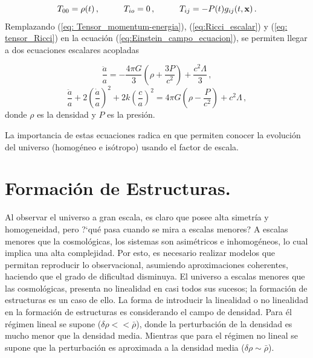\begin{equation}
T_{00}= \rho(t)\,, \hspace{1cm} T_{io}=0\,, \hspace{1cm} T_{ij}=-P(t)g_{ij}(t,\bf{x})\,.
\label{eq: Tensor_momentum-energia}
\end{equation}
%
Remplazando (\ref{eq: Tensor_momentum-energia}), (\ref{eq:Ricci_escalar}) y (\ref{eq: tensor_Ricci}) en la ecuación (\ref{eq:Einstein_campo_ecuacion}), se permiten llegar a dos ecuaciones escalares acopladas

\begin{equation}
\frac{\ddot{a}}{a} = -\frac{4\pi G}{3}\left(\rho + \frac{3P}{c^{2}} \right) + \frac{c^{2}\Lambda}{3}\,,
\end{equation}
\begin{equation}
\frac{\ddot{a}}{a}+2 \left(\frac{\dot{a}}{a}\right)^{2} + 2k\left(\frac{c}{a} \right)^{2} =4\pi G\left( \rho - \frac{P}{c^{2}}\right)+ c^{2}\Lambda\,,
\end{equation}
%
donde $\rho$ es la densidad y $P$ es la presión.

La importancia de estas ecuaciones radica en que permiten conocer la evolución del universo (homogéneo e isótropo) usando el factor de escala. 


\section{Formación de Estructuras.}
\label{sec: Estructure_Formation}




Al observar el universo a gran escala, es claro que posee alta simetría y homogeneidad, pero ?`qué pasa cuando se mira a escalas menores? A escalas menores que la cosmológicas, los sistemas son asimétricos e inhomogéneos, lo cual implica una alta complejidad. Por esto, es necesario realizar modelos que permitan reproducir lo observacional, asumiendo aproximaciones coherentes,  haciendo que el grado de dificultad disminuya. El universo a escalas menores que las cosmológicas, presenta no linealidad en casi todos sus sucesos; la formación de estructuras es un caso de ello. La forma de introducir la linealidad o no linealidad en la formación de estructuras es considerando el campo de densidad. Para él régimen lineal se supone ($\delta\rho << \bar{\rho}$), donde la perturbación de la densidad es mucho menor que la densidad media. Mientras que para el régimen no lineal se supone que la perturbación es aproximada a la densidad media ($\delta\rho \sim \bar{\rho}$).


